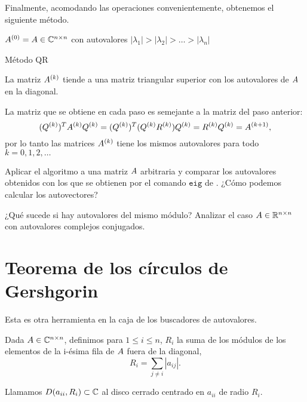Finalmente, acomodando las operaciones  convenientemente, obtenemos el siguiente método.

\begin{algorithm}[H]
\SetAlgoLined
$\Ab^{(0)} = \Ab \in \Cnn$ con autovalores $|\lambda_1| > |\lambda_2| > \dots > |\lambda_n|$\;
 \caption{Método QR}
\end{algorithm}

\begin{prop}
La matriz $\Ab^{(k)}$ tiende a una matriz triangular superior con los autovalores de $\Ab$ en la diagonal.
\end{prop}

\begin{remark} La matriz que se obtiene en cada paso es semejante a la matriz del paso anterior:
$$
(\Qb^{(k)})^T \Ab^{(k)} \Qb^{(k)} = (\Qb^{(k)})^T (\Qb^{(k)} \Rb^{(k)}) \Qb^{(k)} = \Rb^{(k)} \Qb^{(k)} = \Ab^{(k+1)},
$$
por lo tanto las matrices $\Ab^{(k)}$ tiene los mismos autovalores para todo $k = 0, 1, 2, \dots$
\end{remark}

\begin{ejercicio} Aplicar el algoritmo a una matriz $\Ab$ arbitraria y comparar los autovalores obtenidos con los que se obtienen por el comando $\texttt{eig}$ de \python. ¿Cómo podemos calcular los autovectores?
\end{ejercicio}

\begin{ejercicio}
¿Qué sucede si hay autovalores del mismo módulo? Analizar el caso $\Ab \in \Rnn$ con autovalores complejos conjugados.
\end{ejercicio}


\section{Teorema de los círculos de Gershgorin}

Esta es otra herramienta en la caja de los buscadores de autovalores.

Dada $\Ab \in \Cnn$, definimos para $1 \le i \le n$, $R_i$ la suma de los módulos de los elementos de la i-ésima fila de $\Ab$ fuera de la diagonal,
$$
R_i = \sum_{j \neq i} | a_{ij} |.
$$

Llamamos $D(a_{ii}, R_{i}) \subset \mathbb C$ al disco cerrado centrado en $a_{ii}$ de radio $R_{i}$.

